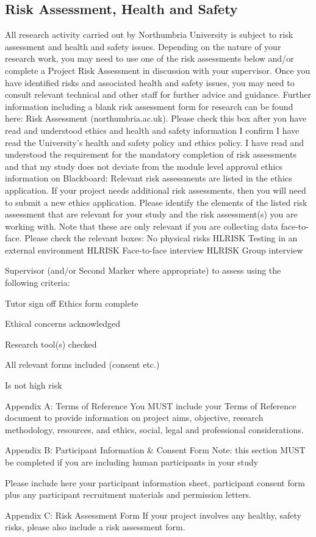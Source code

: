 \documentclass[../CHEFCookingHelperForEveryonesFridge.tex]{subfiles}
\begin{document}
\subsection{Risk Assessment, Health and Safety}
All research activity carried out by Northumbria University is subject to risk assessment and health and safety issues. Depending on the nature of your research work, you may need to use one of the risk assessments below and/or complete a Project Risk Assessment in discussion with your supervisor. Once you have identified risks and associated health and safety issues, you may need to consult relevant technical and other staff for further advice and guidance. Further information including a blank risk assessment form for research can be found here: Risk Assessment (northumbria.ac.uk).
Please check this box after you have read and understood ethics and health and safety information
   I confirm I have read the University's health and safety policy and ethics policy. I have read and understood the requirement for the mandatory completion of risk assessments and that my study does not deviate from the module level approval ethics information on Blackboard:  Relevant risk assessments are listed in the ethics application. If your project needs additional risk assessments, then you will need to submit a new ethics application. Please identify the elements of the listed risk assessment that are relevant for your study and the risk assessment(s) you are working with. Note that these are only relevant if you are collecting data face-to-face.
Please check the relevant boxes:
   No physical risks
   HL\textunderscore RISK Testing in an external environment
   HL\textunderscore RISK Face-to-face interview
   HL\textunderscore RISK Group interview

Supervisor (and/or Second Marker where appropriate) to assess using the following criteria:

Tutor sign off
Ethics form complete 

Ethical concerns acknowledged 

Research tool(s) checked 

All relevant forms included (consent etc.) 

Is not high risk 


Appendix A: Terms of Reference
You MUST include your Terms of Reference document to provide information on project aims, objective, research methodology, resources, and ethics, social, legal and professional considerations.


Appendix B: Participant Information \& Consent Form
Note: this section MUST be completed if you are including human participants in your study

Please include here your participant information sheet, participant consent form plus any participant recruitment materials and permission letters.

Appendix C: Risk Assessment Form
If your project involves any healthy, safety risks, please also include a risk assessment form.

\ifSubfilesClassLoaded{
    \todos
}{}
\end{document}
